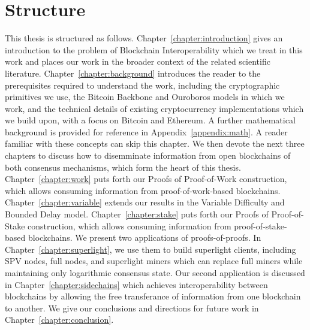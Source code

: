 \section*{Structure}

This thesis is structured as follows. Chapter~\ref{chapter:introduction} gives
an introduction to the problem of Blockchain Interoperability which we treat in
this work and places our work in the broader context of the related scientific
literature. Chapter~\ref{chapter:background} introduces the reader to the
prerequisites required to understand the work, including the cryptographic
primitives we use, the Bitcoin Backbone and Ouroboros models in which we work, and the
technical details of existing cryptocurrency implementations which we build
upon, with a focus on Bitcoin and Ethereum. A further mathematical background is
provided for reference in Appendix~\ref{appendix:math}. A reader familiar with
these concepts can skip this chapter. We then devote the next three chapters to
discuss how to disemminate information from open blockchains of both consensus
mechanisms, which form the heart of this thesis. Chapter~\ref{chapter:work} puts forth our Proofs of Proof-of-Work
construction, which allows consuming information from proof-of-work-based
blockchains. Chapter~\ref{chapter:variable} extends our results in the Variable Difficulty and Bounded Delay model. Chapter~\ref{chapter:stake} puts forth our Proofs of
Proof-of-Stake construction, which allows consuming information from
proof-of-stake-based blockchains. We present two applications of
proofs-of-proofs. In Chapter~\ref{chapter:superlight}, we use them to build
superlight clients, including SPV nodes, full nodes, and superlight miners which
can replace full miners while maintaining only logarithmic consensus state. Our
second application is discussed in Chapter~\ref{chapter:sidechains} which
achieves interoperability between blockchains by allowing the free transferance
of information from one blockchain to another. We give our conclusions and
directions for future work in Chapter~\ref{chapter:conclusion}.
